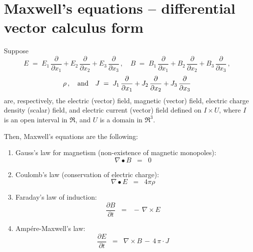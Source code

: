 

\section{Maxwell's equations -- differential vector calculus form}
\setcounter{theorem}{0}
\setcounter{equation}{0}


\renewcommand{\theenumi}{\roman{enumi}}
\renewcommand{\labelenumi}{\textnormal{(\theenumi)}$\;\;$}


Suppose
\begin{equation*}
E \; = \; E_{1}\,\dfrac{\partial}{\partial x_{1}} + E_{2}\,\dfrac{\partial}{\partial x_{2}} + E_{3}\,\dfrac{\partial}{\partial x_{3}}\,,
\quad
B \; = \; B_{1}\,\dfrac{\partial}{\partial x_{1}} + B_{2}\,\dfrac{\partial}{\partial x_{2}} + B_{3}\,\dfrac{\partial}{\partial x_{3}}\,,
\end{equation*}
\begin{equation*}
\rho\,,
\quad\textnormal{and}\quad
J \; = \; J_{1}\,\dfrac{\partial}{\partial x_{1}} + J_{2}\,\dfrac{\partial}{\partial x_{2}} + J_{3}\,\dfrac{\partial}{\partial x_{3}}
\end{equation*}
are, respectively, the electric (vector) field, magnetic (vector) field,
electric charge density (scalar) field, and electric current (vector) field
defined on $I \times U$,
where $I$ is an open interval in $\Re$, and $U$ is a domain in $\Re^{3}$.

\vskip 0.5cm
\noindent
Then, Maxwell's equations are the following:
\begin{enumerate}
\item
	Gauss's law for magnetism (non-existence of magnetic monopoles):
	\begin{equation*}
	\nabla \bullet B \;\; = \;\; 0
	\end{equation*}

\item
	Coulomb's law (conservation of electric charge):
	\begin{equation*}
	\nabla \bullet E \;\; = \;\; 4 \pi \rho
	\end{equation*}

\item
	Faraday's law of induction:
	\begin{equation*}
	\dfrac{\partial B}{\partial t} \;\; = \;\; -\,\nabla \times E
	\end{equation*}

\item
	Amp\'{e}re-Maxwell's law:
	\begin{equation*}
	\dfrac{\partial E}{\partial t} \;\; = \;\; \nabla \times B \,-\, 4\,\pi\cdot J
	\end{equation*}

\end{enumerate}

